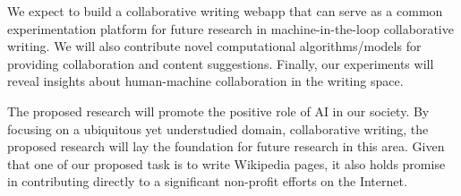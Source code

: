  We expect to build a collaborative writing webapp that can serve as a common experimentation platform for future research in machine-in-the-loop collaborative writing.
We will also contribute novel computational algorithms/models for providing collaboration and content suggestions.
Finally, our experiments will reveal insights about human-machine collaboration in the writing space.

 The proposed research will promote the positive role of AI in our society.
By focusing on a ubiquitous yet understudied domain, collaborative writing, the proposed research will lay the foundation for future research in this area.
Given that one of our proposed task is to write Wikipedia pages, it also holds promise in contributing directly to a significant non-profit efforts on the Internet.